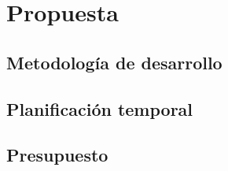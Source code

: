 \chapter{Propuesta}


\section{Metodología de desarrollo}


\section{Planificación temporal}


\section{Presupuesto}